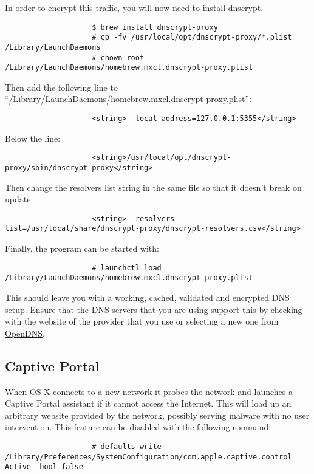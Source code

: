 				In order to encrypt this traffic, you will now need to install dnscrypt.
				\begin{verbatim}
					$ brew install dnscrypt-proxy
					# cp -fv /usr/local/opt/dnscrypt-proxy/*.plist /Library/LaunchDaemons
					# chown root /Library/LaunchDaemons/homebrew.mxcl.dnscrypt-proxy.plist
				\end{verbatim}
				Then add the following line to ``/Library/LaunchDaemons/homebrew.mxcl.dnscrypt-proxy.plist'':
				\begin{verbatim}
					<string>--local-address=127.0.0.1:5355</string>
				\end{verbatim}
				Below the line:
				\begin{verbatim}
					<string>/usr/local/opt/dnscrypt-proxy/sbin/dnscrypt-proxy</string>
				\end{verbatim}
				Then change the resolvers list string in the same file so that it doesn't break on update:
				\begin{verbatim}
					<string>--resolvers-list=/usr/local/share/dnscrypt-proxy/dnscrypt-resolvers.csv</string>
				\end{verbatim}
				Finally, the program can be started with:
				\begin{verbatim}
					# launchctl load /Library/LaunchDaemons/homebrew.mxcl.dnscrypt-proxy.plist
				\end{verbatim}

				This should leave you with a working, cached, validated and encrypted DNS setup.
				Ensure that the DNS servers that you are using support this by checking with the website of the provider that you use or
				selecting a new one from \href{https://www.opendns.com/}{OpenDNS}.

			\subsection{Captive Portal}
				When OS X connects to a new network it probes the network and launches a Captive Portal assistant if it cannot access the Internet.
				This will load up an arbitrary website provided by the network, possibly serving malware with no user intervention.
				This feature can be disabled with the following command:
				\begin{verbatim}
					# defaults write /Library/Preferences/SystemConfiguration/com.apple.captive.control Active -bool false
				\end{verbatim}

